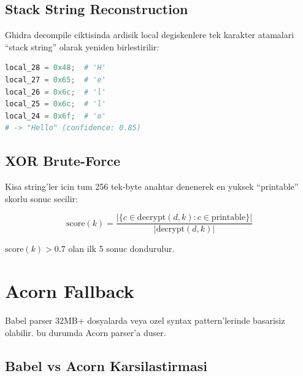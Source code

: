 \subsection{Stack String Reconstruction}

Ghidra decompile ciktisinda ardisik local degiskenlere tek karakter atamalari ``stack string'' olarak yeniden birlestirilir:

\begin{lstlisting}[language=Python, caption={Stack string ornegi (Ghidra decompile ciktisi)}]
local_28 = 0x48;  # 'H'
local_27 = 0x65;  # 'e'
local_26 = 0x6c;  # 'l'
local_25 = 0x6c;  # 'l'
local_24 = 0x6f;  # 'o'
# -> "Hello" (confidence: 0.85)
\end{lstlisting}

\subsection{XOR Brute-Force}

Kisa string'ler icin tum 256 tek-byte anahtar denenerek en yuksek ``printable'' skorlu sonuc secilir:

\begin{equation}
\text{score}(k) = \frac{|\{c \in \text{decrypt}(d, k) : c \in \text{printable}\}|}{|\text{decrypt}(d, k)|}
\end{equation}

$\text{score}(k) > 0.7$ olan ilk 5 sonuc dondurulur.


\section{Acorn Fallback}
\label{sec:acorn-fallback}

Babel parser 32MB+ dosyalarda veya ozel syntax pattern'lerinde basarisiz olabilir.  bu durumda Acorn parser'a duser.

\subsection{Babel vs Acorn Karsilastirmasi}

